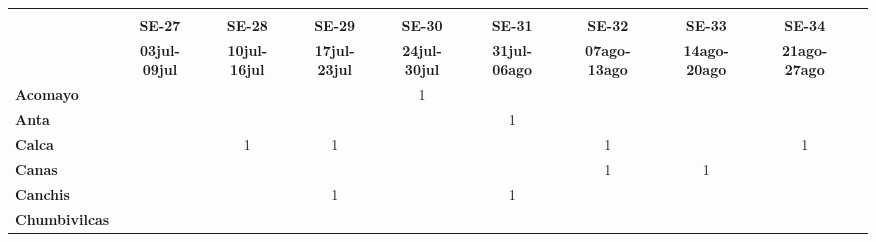 \begin{tabular}{lccccccccc}
	\textbf{}              	  & \multicolumn{1}{l}{}                        & \multicolumn{1}{l}{}      & \multicolumn{1}{l}{}                         & \multicolumn{1}{l}{}                         & \multicolumn{1}{l}{}                         & \multicolumn{1}{l}{}                        & \multicolumn{1}{l}{}                         & \multicolumn{1}{l}{}     \\                   
	\textbf{}                                                                          		
	&\textbf{SE-27}								&\textbf{SE-28}								&\textbf{SE-29} 							&\textbf{SE-30}								&\textbf{SE-31} 							&\textbf{SE-32}								&\textbf{SE-33}								&\textbf{SE-34}\\							
	\textbf{}              	  		
	&\textbf{03jul-09jul}						&\textbf{10jul-16jul}						&\textbf{17jul-23jul}						&\textbf{24jul-30jul}						&\textbf{31jul-06ago}						&\textbf{07ago-13ago}						&\textbf{14ago-20ago}						&\textbf{21ago-27ago}\\
	\textbf{Acomayo}                        		
	&\cellcolor[HTML]{FCC46C}
	&\cellcolor[HTML]{FCC46C}					&\cellcolor[HTML]{FCC46C}
	&1											&\cellcolor[HTML]{FCC46C}
	&\cellcolor[HTML]{FCC46C}					&\cellcolor[HTML]{FCC46C}
	&\cellcolor[HTML]{FCC46C}\\
	\textbf{Anta}                                                   		
	&\cellcolor[HTML]{FCC46C}					&\cellcolor[HTML]{FCC46C}					&\cellcolor[HTML]{FCC46C}					&\cellcolor[HTML]{FCC46C}					&1											&\cellcolor[HTML]{FCC46C}					&\cellcolor[HTML]{FCC46C}					&\cellcolor[HTML]{FCC46C}\\					
	\textbf{Calca}      				       								            
	&\cellcolor[HTML]{FCC46C}					&1				   							&1  										&\cellcolor[HTML]{FCC46C}	 	 	    	&\cellcolor[HTML]{FCC46C}					&1											&\cellcolor[HTML]{FCC46C}					&1\\          			
	\textbf{Canas}                              											
	&\cellcolor[HTML]{FCC46C}
	&\cellcolor[HTML]{FCC46C} 					&\cellcolor[HTML]{FCC46C}
	&\cellcolor[HTML]{FCC46C}					&\cellcolor[HTML]{FCC46C}
	&1											&1
	&\cellcolor[HTML]{FCC46C}\\	
	\textbf{Canchis}                             											
	&\cellcolor[HTML]{FCC46C}					&\cellcolor[HTML]{FCC46C}					&1											&\cellcolor[HTML]{FCC46C}					&1			
	&\cellcolor[HTML]{FCC46C}					&\cellcolor[HTML]{FCC46C}			&\cellcolor[HTML]{FCC46C}\\											
	\textbf{Chumbivilcas}                      												

\end{tabular}
